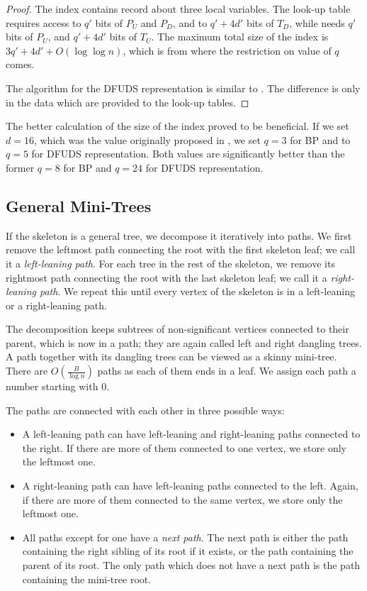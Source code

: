 \begin{proof}
	The index contains record about three local variables.
	The look-up table \dfudsSkinnyDown{} requires access to $q'$ bits of $P_U$ and $P_D$, and to $q' + 4d'$ bits of $T_D$, while \dfudsSkinnyDown{} needs $q'$ bits of $P_U$, and $q' + 4d'$ bits of $T_U$.
	The maximum total size of the index is $3q' + 4d' + O(\log \log n)$, which is from where the restriction on value of $q$ comes.	
	
	The algorithm \dfudsSubstringSkinny{} for the DFUDS representation is similar to \bpSubstringSkinny{}.
	The difference is only in the data which are provided to the look-up tables.
\end{proof}

The better calculation of the size of the index proved to be beneficial.
If we set $d = 16$, which was the value originally proposed in \cite{farzan2009universal}, we set $q = 3$ for BP and to $q = 5$ for DFUDS representation.
Both values are significantly better than the former $q = 8$ for BP and $q = 24$ for DFUDS representation.

\subsection{General Mini-Trees}

If the skeleton is a general tree, we decompose it iteratively into paths.
We first remove the leftmost path connecting the root with the first skeleton leaf; we call it a \emph{left-leaning path}.
For each tree in the rest of the skeleton, we remove its rightmost path connecting the root with the last skeleton leaf; we call it a \emph{right-leaning path}.
We repeat this until every vertex of the skeleton is in a left-leaning or a right-leaning path.

The decomposition keeps subtrees of non-significant vertices connected to their parent, which is now in a path; they are again called left and right dangling trees.
A path together with its dangling trees can be viewed as a skinny mini-tree.
There are $O\left(\frac{B}{\log n}\right)$ paths as each of them ends in a leaf.
We assign each path a number starting with $0$.

The paths are connected with each other in three possible ways:
\begin{itemize}
	\item A left-leaning path can have left-leaning and right-leaning paths connected to the right.
	If there are more of them connected to one vertex, we store only the leftmost one.
	
	\item A right-leaning path can have left-leaning paths connected to the left.
	Again, if there are more of them connected to the same vertex, we store only the leftmost one.
	
	\item All paths except for one have a \emph{next path}.
	The next path is either the path containing the right sibling of its root if it exists, or the path containing the parent of its root.
	The only path which does not have a next path is the path containing the mini-tree root.
\end{itemize}

